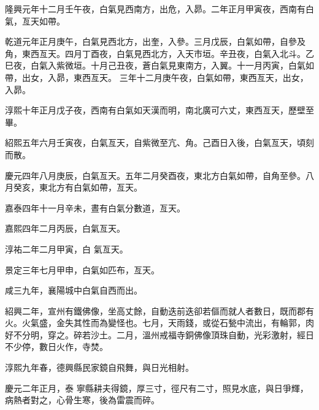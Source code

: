 \begin{pinyinscope}
 隆興元年十二月壬午夜，白氣見西南方，出危，入昴。二年正月甲寅夜，西南有白氣，亙天如帶。



 乾道元年正月庚午，白氣見西北方，出奎，入參。三月戊辰，白氣如帶，自參及角，東西亙天。四月丁酉夜，白氣見西北方，入天市垣。辛丑夜，白氣入北斗。乙巳夜，白氣入紫微垣。十月己丑夜，蒼白氣見東南方，入翼。十一月丙寅，白氣如帶，出女，入昴，東西亙天。
 三年十二月庚午夜，白氣如帶，東西亙天，出女，入昴。



 淳熙十年正月戊子夜，西南有白氣如天漢而明，南北廣可六丈，東西亙天，歷壁至畢。



 紹熙五年六月壬寅夜，白氣亙天，自紫微至亢、角。己酉日入後，白氣亙天，頃刻而散。



 慶元四年八月庚辰，白氣亙天。五年二月癸酉夜，東北方白氣如帶，自角至參。八月癸亥，東北方有白氣如帶，亙天。



 嘉泰四年十一月辛未，晝有白氣分數道，亙天。



 嘉熙四年二月丙辰，白氣亙天。



 淳祐二年二月甲寅，白
 氣亙天。



 景定三年七月甲申，白氣如匹布，亙天。



 咸三九年，襄陽城中白氣自西而出。



 紹興二年，宣州有鐵佛像，坐高丈餘，自動迭前迭卻若傴而就人者數日，既而郡有火。火氣盛，金失其性而為變怪也。七月，天雨錢，或從石甃中流出，有輪郭，肉好不分明，穿之。碎若沙土。二月，溫州戒福寺銅佛像頂珠自動，光彩激射，經日不少停，數日火作，寺焚。



 淳熙九年春，德興縣民家鏡自飛舞，與日光相射。



 慶元二年正月，泰
 寧縣耕夫得鏡，厚三寸，徑尺有二寸，照見水底，與日爭輝，病熱者對之，心骨生寒，後為雷震而碎。



\end{pinyinscope}
